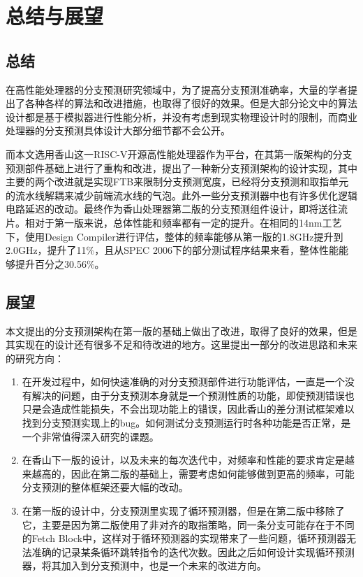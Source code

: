
\chapter{总结与展望}

\section{总结}

在高性能处理器的分支预测研究领域中，为了提高分支预测准确率，大量的学者提出了各种各样的算法和改进措施，也取得了很好的效果。但是大部分论文中的算法设计都是基于模拟器进行性能分析，并没有考虑到现实物理设计时的限制，而商业处理器的分支预测具体设计大部分细节都不会公开。

而本文选用香山这一RISC-V开源高性能处理器作为平台，在其第一版架构的分支预测部件基础上进行了重构和改进，提出了一种新分支预测架构的设计实现，其中主要的两个改进就是实现FTB来限制分支预测宽度，已经将分支预测和取指单元的流水线解耦来减少前端流水线的气泡。此外一些分支预测器中也有许多优化逻辑电路延迟的改动。最终作为香山处理器第二版的分支预测组件设计，即将送往流片。相对于第一版来说，总体性能和频率都有一定的提升。在相同的14nm工艺下，使用Design Compiler进行评估，整体的频率能够从第一版的1.8GHz提升到2.0GHz，提升了11\%，且从SPEC 2006下的部分测试程序结果来看，整体性能能够提升百分之30.56\%。

\section{展望}

本文提出的分支预测架构在第一版的基础上做出了改进，取得了良好的效果，但是其实现在的设计还有很多不足和待改进的地方。这里提出一部分的改进思路和未来的研究方向：

\begin{enumerate}
    \item 在开发过程中，如何快速准确的对分支预测部件进行功能评估，一直是一个没有解决的问题，由于分支预测本身就是一个预测性质的功能，即使预测错误也只是会造成性能损失，不会出现功能上的错误，因此香山的差分测试框架难以找到分支预测实现上的bug。如何测试分支预测运行时各种功能是否正常，是一个非常值得深入研究的课题。
    \item 在香山下一版的设计，以及未来的每次迭代中，对频率和性能的要求肯定是越来越高的，因此在第二版的基础上，需要考虑如何能够做到更高的频率，可能分支预测的整体框架还要大幅的改动。
    \item 在第一版的设计中，分支预测里实现了循环预测器，但是在第二版中移除了它，主要是因为第二版使用了非对齐的取指策略，同一条分支可能存在于不同的Fetch Block中，这样对于循环预测器的实现带来了一些问题，循环预测器无法准确的记录某条循环跳转指令的迭代次数。因此之后如何设计实现循环预测器，将其加入到分支预测中，也是一个未来的改进方向。
\end{enumerate}

